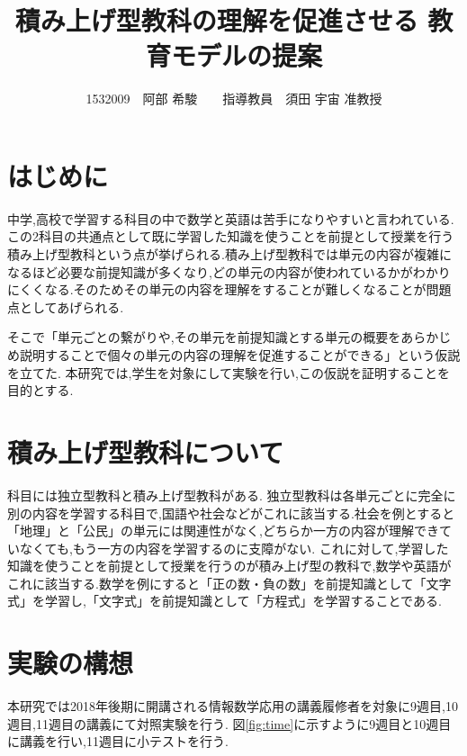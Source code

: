 \documentclass[twocolumn,10pt,a4j]{jsarticle}
\title{積み上げ型教科の理解を促進させる
教育モデルの提案}
\author{1532009　阿部 希駿　　指導教員　須田 宇宙 准教授}
\date{}
\begin{document}
\maketitle

\section{はじめに}

中学,高校で学習する科目の中で数学と英語は苦手になりやすいと言われている.この2科目の共通点として既に学習した知識を使うことを前提として授業を行う積み上げ型教科という点が挙げられる.積み上げ型教科では単元の内容が複雑になるほど必要な前提知識が多くなり,どの単元の内容が使われているかがわかりにくくなる.そのためその単元の内容を理解をすることが難しくなることが問題点としてあげられる\cite{1}.


そこで「単元ごとの繋がりや,その単元を前提知識とする単元の概要をあらかじめ説明することで個々の単元の内容の理解を促進することができる」という仮説を立てた.
本研究では,学生を対象にして実験を行い,この仮説を証明することを目的とする.


\section{積み上げ型教科について}
科目には独立型教科と積み上げ型教科がある.
独立型教科は各単元ごとに完全に別の内容を学習する科目で,国語や社会などがこれに該当する.社会を例とすると「地理」と「公民」の単元には関連性がなく,どちらか一方の内容が理解できていなくても,もう一方の内容を学習するのに支障がない.
これに対して,学習した知識を使うことを前提として授業を行うのが積み上げ型の教科で,数学や英語がこれに該当する.数学を例にすると「正の数・負の数」を前提知識として「文字式」を学習し,「文字式」を前提知識として「方程式」を学習することである.

\section{実験の構想}

本研究では2018年後期に開講される情報数学応用の講義履修者を対象に9週目,10週目,11週目の講義にて対照実験を行う.
図\ref{fig:time}に示すように9週目と10週目に講義を行い,11週目に小テストを行う.
\end{document}
